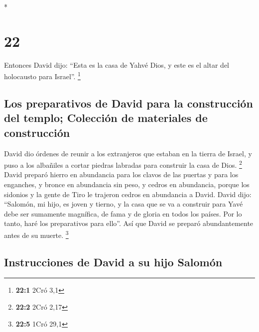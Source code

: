 \begin{paracol}{2}
\switchcolumn[0]*

\hypertarget{section-42}{%
\section{22}\label{section-42}}

 Entonces David dijo: ``Esta es la casa de Yahvé Dios, y
este es el altar del holocausto para Israel''. \footnote{\textbf{22:1}
  2Cró 3,1}

\hypertarget{los-preparativos-de-david-para-la-construcciuxf3n-del-templo-colecciuxf3n-de-materiales-de-construcciuxf3n}{%
\subsection{Los preparativos de David para la construcción del templo;
Colección de materiales de
construcción}\label{los-preparativos-de-david-para-la-construcciuxf3n-del-templo-colecciuxf3n-de-materiales-de-construcciuxf3n}}

 David dio órdenes de reunir a los extranjeros que estaban
en la tierra de Israel, y puso a los albañiles a cortar piedras labradas
para construir la casa de Dios. \footnote{\textbf{22:2} 2Cró 2,17}
 David preparó hierro en abundancia para los clavos de las
puertas y para los enganches, y bronce en abundancia sin peso,
 y cedros en abundancia, porque los sidonios y la gente de
Tiro le trajeron cedros en abundancia a David.  David
dijo: ``Salomón, mi hijo, es joven y tierno, y la casa que se va a
construir para Yavé debe ser sumamente magnífica, de fama y de gloria en
todos los países. Por lo tanto, haré los preparativos para ello''. Así
que David se preparó abundantemente antes de su muerte. \footnote{\textbf{22:5}
  1Cró 29,1}

\hypertarget{instrucciones-de-david-a-su-hijo-salomuxf3n}{%
\subsection{Instrucciones de David a su hijo
Salomón}\label{instrucciones-de-david-a-su-hijo-salomuxf3n}}


\end{paracol}

